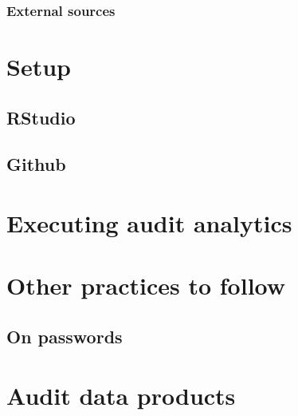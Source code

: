 \documentclass[
]{book}
\begin{document}
\hypertarget{external-sources}{%
\subsection{External sources}\label{external-sources}}

\hypertarget{setup}{%
\chapter{Setup}\label{setup}}

\hypertarget{rstudio}{%
\section{RStudio}\label{rstudio}}

\hypertarget{github}{%
\section{Github}\label{github}}

\hypertarget{executing-audit-analytics}{%
\chapter{Executing audit analytics}\label{executing-audit-analytics}}

\hypertarget{section}{%
\section{}\label{section}}

\hypertarget{other-practices-to-follow}{%
\chapter{Other practices to follow}\label{other-practices-to-follow}}

\hypertarget{on-passwords}{%
\section{On passwords}\label{on-passwords}}

\hypertarget{audit-data-products}{%
\chapter{Audit data products}\label{audit-data-products}}

  
\end{document}
